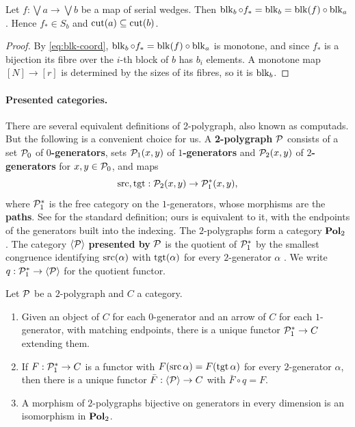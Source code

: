 \documentclass[11pt]{article}
\begin{document}
\begin{lemma}\label{lem:young}
  Let $f : \bigvee a \to \bigvee b$ be a map of serial wedges. Then
  $\operatorname{blk}_b \circ f_* = \operatorname{blk}_b = \operatorname{blk}(f) \circ \operatorname{blk}_a$. Hence $f_* \in S_b$ and
  $\operatorname{cut}(a) \subseteq \operatorname{cut}(b)$.
\end{lemma}
\begin{proof}
  By \eqref{eq:blk-coord}, $\operatorname{blk}_b \circ f_* = \operatorname{blk}(f) \circ \operatorname{blk}_a$ is monotone, and since $f_*$
  is a bijection its fibre over the $i$-th block of $b$ has $b_i$ elements. A monotone map
  $[N] \to [r]$ is determined by the sizes of its fibres, so it is $\operatorname{blk}_b$.
\end{proof}

\paragraph{Presented categories.}
There are several equivalent definitions of 2-polygraph, also known as computads.
But the following is a convenient choice for us.
A \textbf{2-polygraph} $\mathcal{P}$ consists of a set $\mathcal{P}_0$ of \textbf{$0$-generators}, sets
$\mathcal{P}_1(x,y)$ of \textbf{$1$-generators} and $\mathcal{P}_2(x,y)$ of \textbf{$2$-generators} for
$x, y \in \mathcal{P}_0$, and maps
\[
  \operatorname{src}, \operatorname{tgt} : \mathcal{P}_2(x,y) \to \mathcal{P}_1^*(x,y) ,
\]
where $\mathcal{P}_1^*$ is the free category on the $1$-generators, whose morphisms are the
\textbf{paths}. See \cite[Def.~2.2.2]{Polygraphs} for the standard definition; ours is equivalent to it, with
the endpoints of the generators built into the indexing.
The $2$-polygraphs form a category $\mathbf{Pol}_2$ \cite[\S2.2.3]{Polygraphs}. The category
$\left\langle \mathcal{P} \right\rangle$ \textbf{presented by} $\mathcal{P}$ is the quotient of $\mathcal{P}_1^*$ by the smallest congruence
identifying $\operatorname{src}(\alpha)$ with $\operatorname{tgt}(\alpha)$ for every $2$-generator $\alpha$
\cite[\S2.3.3]{Polygraphs}. We write $q:\mathcal{P}_1^* \to \left\langle \mathcal{P} \right\rangle$ for the quotient functor.

\begin{proposition}\label{prop:present-univ}
  Let $\mathcal{P}$ be a $2$-polygraph and $C$ a category.
  \begin{enumerate}[label=(\roman*)]
    \item \cite[Lem.~2.1.3]{Polygraphs} Given an object of $C$ for each $0$-generator and an arrow
      of $C$ for each $1$-generator, with matching endpoints, there is a unique functor
      $\mathcal{P}_1^* \to C$ extending them.
    \item \cite[Lem.~2.3.4]{Polygraphs} If $F : \mathcal{P}_1^* \to C$ is a functor with
      $F(\operatorname{src}\alpha) = F(\operatorname{tgt}\alpha)$ for every $2$-generator $\alpha$, then there is a unique
      functor $\bar F : \left\langle \mathcal{P} \right\rangle \to C$ with $\bar F \circ q = F$.
    \item A morphism of $2$-polygraphs bijective on generators in every dimension is an
      isomorphism in $\mathbf{Pol}_2$.
  \end{enumerate}
\end{proposition}
\end{document}
